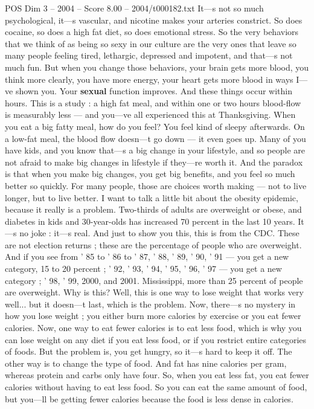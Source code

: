\begin{textsample}{POS Dim 3 – 2004 – Score 8.00 – 2004/t000182.txt}
It—s not so much psychological, it—s vascular, and nicotine makes your arteries constrict.
So does cocaine, so does a high fat diet, so does emotional stress.
So the very behaviors that we think of as being so sexy in our culture are the very ones that leave so many people feeling tired, lethargic, depressed and impotent, and that—s not much fun.
But when you change those behaviors, your brain gets more blood, you think more clearly, you have more energy, your heart gets more blood in ways I—ve shown you.
Your \textbf{sexual} function improves.
And these things occur within hours.
This is a study : a high fat meal, and within one or two hours blood-flow is measurably less — and you—ve all experienced this at Thanksgiving.
When you eat a big fatty meal, how do you feel?
You feel kind of sleepy afterwards.
On a low-fat meal, the blood flow doesn—t go down — it even goes up.
Many of you have kids, and you know that—s a big change in your lifestyle, and so people are not afraid to make big changes in lifestyle if they—re worth it.
And the paradox is that when you make big changes, you get big benefits, and you feel so much better so quickly.
For many people, those are choices worth making — not to live longer, but to live better.
I want to talk a little bit about the obesity epidemic, because it really is a problem.
Two-thirds of adults are overweight or obese, and diabetes in kids and 30-year-olds has increased 70 percent in the last 10 years.
It—s no joke : it—s real.
And just to show you this, this is from the CDC.
These are not election returns ; these are the percentage of people who are overweight.
And if you see from ' 85 to ' 86 to ' 87, ' 88, ' 89, ' 90, ' 91 — you get a new category, 15 to 20 percent ; ' 92, ' 93, ' 94, ' 95, ' 96, ' 97 — you get a new category ; ' 98, ' 99, 2000, and 2001.
Mississippi, more than 25 percent of people are overweight.
Why is this?
Well, this is one way to lose weight that works very well... but it doesn—t last, which is the problem.
Now, there—s no mystery in how you lose weight ; you either burn more calories by exercise or you eat fewer calories.
Now, one way to eat fewer calories is to eat less food, which is why you can lose weight on any diet if you eat less food, or if you restrict entire categories of foods.
But the problem is, you get hungry, so it—s hard to keep it off.
The other way is to change the type of food.
And fat has nine calories per gram, whereas protein and carbs only have four.
So, when you eat less fat, you eat fewer calories without having to eat less food.
So you can eat the same amount of food, but you—ll be getting fewer calories because the food is less dense in calories.

\end{textsample}
